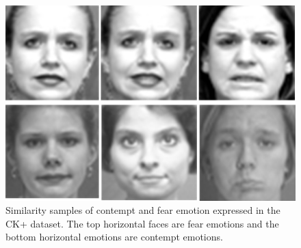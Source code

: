 \documentclass[master]{thesis-uestc}
\begin{document}
\begin{figure}[ht]
\includegraphics[width=5in]{pic/ck+similarity.jpg}
\caption{Similarity samples of contempt and fear emotion expressed in the CK+ dataset. The top horizontal faces are fear emotions and the bottom horizontal emotions are contempt emotions.}
\label{ck+_similarity}
\end{figure}
\end{document}
